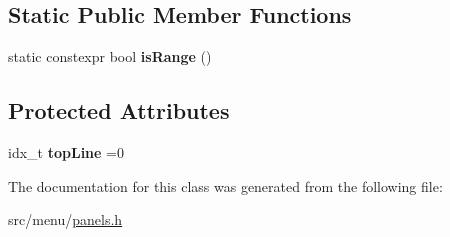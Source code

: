 \subsection*{Static Public Member Functions}
\begin{DoxyCompactItemize}
\item 
\mbox{\label{classRangePanel_ab5afc2b81ec2f1d43e4c13d103168e7c}} 
static constexpr bool {\bfseries is\+Range} ()
\end{DoxyCompactItemize}
\subsection*{Protected Attributes}
\begin{DoxyCompactItemize}
\item 
\mbox{\label{classRangePanel_ae51c75c38328641275d6af9c61bd838f}} 
idx\+\_\+t {\bfseries top\+Line} =0
\end{DoxyCompactItemize}


The documentation for this class was generated from the following file\+:\begin{DoxyCompactItemize}
\item 
src/menu/\hyperlink{panels_8h}{panels.\+h}\end{DoxyCompactItemize}
